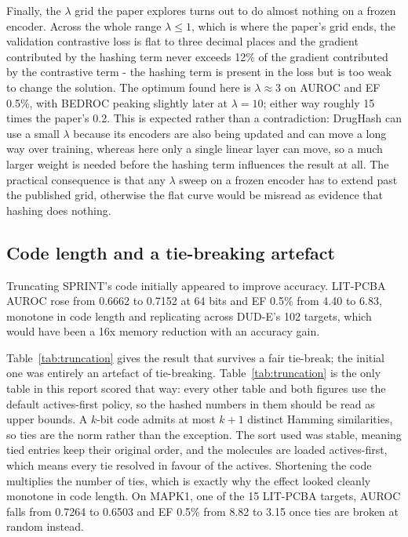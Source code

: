 \documentclass[10pt,a4paper]{article}
\begin{document}
Finally, the $\lambda$ grid the paper explores turns out to do almost nothing on a frozen
encoder. Across the whole range $\lambda \leq 1$, which is where the paper's grid ends, the
validation contrastive loss is flat to three decimal places and the gradient contributed by the
hashing term never exceeds 12\% of the gradient contributed by the contrastive term - the
hashing term is present in the loss but is too weak to change the solution. The optimum found
here is $\lambda \approx 3$ on AUROC and EF 0.5\%, with BEDROC peaking slightly later at
$\lambda = 10$; either way roughly 15 times the paper's 0.2. This is expected rather than a
contradiction: DrugHash can use a small $\lambda$ because its encoders are also being updated
and can move a long way over training, whereas here only a single linear layer can move, so a
much larger weight is needed before the hashing term influences the result at all. The
practical consequence is that any $\lambda$ sweep on a frozen encoder has to extend past the
published grid, otherwise the flat curve would be misread as evidence that hashing does
nothing.

\subsection{Code length and a tie-breaking artefact}\label{sec:code-length}
Truncating SPRINT's code initially appeared to improve accuracy. LIT-PCBA AUROC rose from
0.6662 to 0.7152 at 64 bits and EF 0.5\% from 4.40 to 6.83, monotone in code length and
replicating across DUD-E's 102 targets, which would have been a 16x memory reduction with an
accuracy gain.

Table~\ref{tab:truncation} gives the result that survives a fair tie-break; the initial one was
entirely an artefact of tie-breaking. Table~\ref{tab:truncation} is the only table in this
report scored that way: every other table and both figures use the default actives-first
policy, so the hashed numbers in them should be read as upper bounds. A $k$-bit code admits at most $k+1$ distinct
Hamming similarities, so ties are the norm rather than the exception. The sort used was stable,
meaning tied entries keep their original order, and the molecules are loaded actives-first,
which means every tie resolved in favour of the actives. Shortening the code multiplies the
number of ties, which is exactly why the effect looked cleanly monotone in code length. On
MAPK1, one of the 15 LIT-PCBA targets, AUROC falls from 0.7264 to 0.6503 and EF 0.5\% from
8.82 to 3.15 once ties are broken at random instead.
\end{document}
